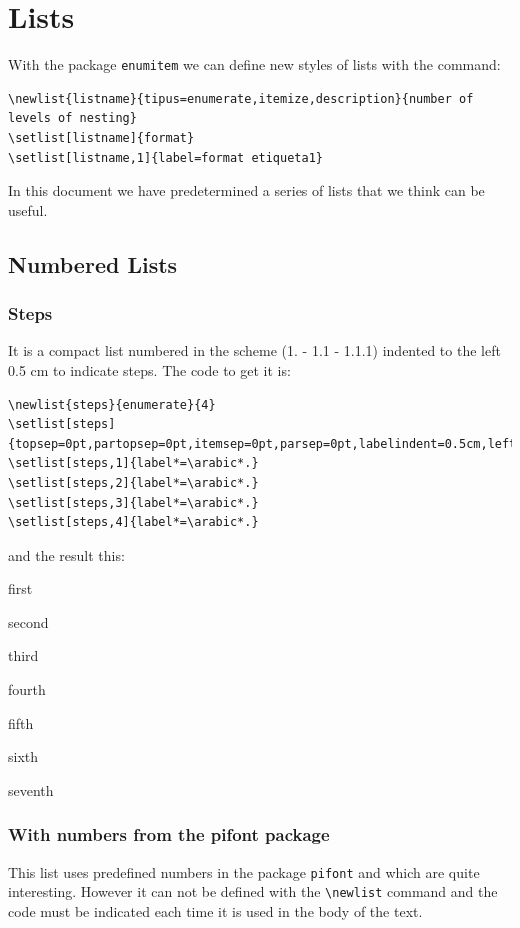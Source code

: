 \documentclass[a4paper,
                             twoside,
                             BCOR1.0cm,
                             DIV11,
                             parskip=full,
                             11pt]{scrbook}
\begin{document}
\section{Lists}\label{sec:lists}
With the package \verb+enumitem+ we can define new styles of lists with the command:
\begin{tiny}
\begin{verbatim}
\newlist{listname}{tipus=enumerate,itemize,description}{number of levels of nesting} 
\setlist[listname]{format}
\setlist[listname,1]{label=format etiqueta1}
\end{verbatim}
\end{tiny}

In this document we have predetermined a series of lists that we think can be useful.

\subsection{Numbered Lists}\label{sbsec:listnum}
\subsubsection{Steps}\label{ssbsec:steps}
It is a compact list numbered in the scheme (1. - 1.1 - 1.1.1) indented to the left 0.5 cm to indicate steps. The code to get it is:
\begin{tiny}
\begin{verbatim}
\newlist{steps}{enumerate}{4}
\setlist[steps]{topsep=0pt,partopsep=0pt,itemsep=0pt,parsep=0pt,labelindent=0.5cm,leftmargin=*}
\setlist[steps,1]{label*=\arabic*.}
\setlist[steps,2]{label*=\arabic*.}
\setlist[steps,3]{label*=\arabic*.}
\setlist[steps,4]{label*=\arabic*.}
\end{verbatim}
\end{tiny}
and the result this:
 \begin{steps}
\item first
\item second
\item third
\item fourth
\item fifth
\item sixth
\item seventh
\end{steps}
\subsubsection{With numbers from the pifont package}\label{ssbsec:pifont}
This list uses predefined numbers in the package \verb+pifont+ and which are quite interesting. However it can not be defined with the \verb+\newlist+ command and the code must be indicated each time it is used in the body of the text.
\end{document}
